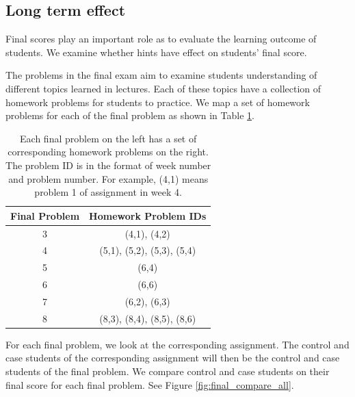 \documentclass{sigchi}
\begin{document}
\subsection{Long term effect}
Final scores play an important role as to evaluate the learning outcome of students. We examine whether hints have effect on students' final score.

The problems in the final exam aim to examine students understanding of different topics learned in lectures. Each of these topics have a collection of homework problems for students to practice. We map a set of homework problems for each of the final problem as shown in Table \ref{tab:map}.

\begin{table}[h]
\caption{Each final problem on the left has a set of corresponding homework problems on the right. The problem ID is in the format of week number and problem number. For example, (4,1) means problem 1 of assignment in week 4.}
\begin{center}
  \begin{tabular}{ c | c }
   Final Problem & Homework Problem IDs \\ \hline
	3 & (4,1), (4,2) \\
	4 & (5,1), (5,2), (5,3), (5,4) \\
    5 & (6,4) \\
    6 & (6,6) \\
    7 & (6,2), (6,3) \\
    8 & (8,3), (8,4), (8,5), (8,6) \\ \hline
  \end{tabular}
  \label{tab:map}
  \end{center}
\end{table}

For each final problem, we look at the corresponding assignment. The control and case students of the corresponding assignment will then be the control and case students of the final problem. We compare control and case students on their final score for each final problem. See Figure \ref{fig:final_compare_all}.

\end{document}

